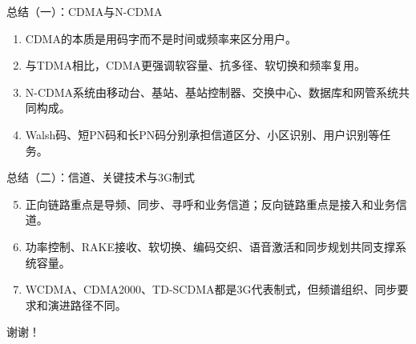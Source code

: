 \documentclass[aspectratio=169]{beamer}
\begin{document}
\begin{frame}[t]{总结（一）：CDMA与N-CDMA}
    \small
    \begin{enumerate}
        \item CDMA的本质是用码字而不是时间或频率来区分用户。
        \item 与TDMA相比，CDMA更强调软容量、抗多径、软切换和频率复用。
        \item N-CDMA系统由移动台、基站、基站控制器、交换中心、数据库和网管系统共同构成。
        \item Walsh码、短PN码和长PN码分别承担信道区分、小区识别、用户识别等任务。
    \end{enumerate}
\end{frame}

\begin{frame}[t]{总结（二）：信道、关键技术与3G制式}
    \small
    \begin{enumerate}
        \setcounter{enumi}{4}
        \item 正向链路重点是导频、同步、寻呼和业务信道；反向链路重点是接入和业务信道。
        \item 功率控制、RAKE接收、软切换、编码交织、语音激活和同步规划共同支撑系统容量。
        \item WCDMA、CDMA2000、TD-SCDMA都是3G代表制式，但频谱组织、同步要求和演进路径不同。
    \end{enumerate}
\end{frame}

\begin{frame}
    \centering
    \vspace{1.6cm}
    {\Huge 谢谢！}
\end{frame}
\end{document}
